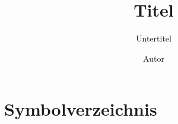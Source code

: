 \documentclass[%
	BCOR12mm, %
	cleardoublepage=empty, %
	tablecaptionabove, %
	toc=bib, %
	toc=listofnumbered, %
	listof=leveldown, %
	numbers=noendperiod %
	]{scrbook}
\begin{document}
\titlehead{\Large Karlsruher Institut für Technologie (KIT) \hfill Institut} %
\subject{Abschlussarbeit} %
\title{Titel}
\subtitle{Untertitel}
\author{Autor} %
\publishers{} %
\maketitle
\frontmatter

\tableofcontents
\chapter{Symbolverzeichnis} %
\label{cha:symbolverzeichnis}


\mainmatter

\end{document}
